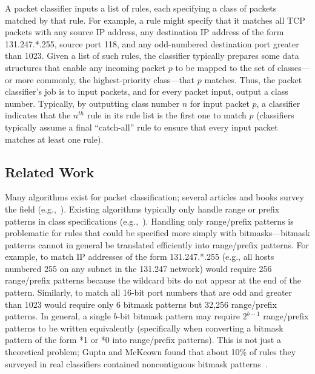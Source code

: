 \documentclass[10pt, conference, compsocconf]{IEEEtran}
\begin{document}
A packet classifier inputs a list of rules, each specifying a class of packets
matched by that rule.  For example, a rule might specify that it matches all TCP
packets with any source IP address, any destination IP address of the form
131.247.*.255, source port 118, and any odd-numbered destination port greater
than 1023.  Given a list of such rules, the classifier typically prepares some
data structures that enable any incoming packet $p$ to be mapped to the set of
classes---or more commonly, the highest-priority class---that $p$ matches.
Thus, the packet classifier's job is to input packets, and for every packet
input, output a class number.  Typically, by outputting class number $n$ for
input packet $p$, a classifier indicates that the $n^{th}$ rule in its rule list
is the first one to match $p$ (classifiers typically assume a final
``catch-all'' rule to ensure that every input packet matches at least one rule).

\subsection{Related Work}
Many algorithms exist for packet classification; several articles and books
survey the field (e.g.,~\cite{taylor:survey,ch48,ch49,medhi+:book}).  Existing
algorithms typically only handle range or prefix patterns in class
specifications (e.g.,~\cite{trie1,speed,geometric,bob,tss,babo-journal}).
Handling only range/prefix patterns is problematic for rules that could be
specified more simply with bitmasks---bitmask patterns cannot in general be
translated efficiently into range/prefix patterns.  For example, to match IP
addresses of the form 131.247.*.255 (e.g., all hosts numbered 255 on any subnet
in the 131.247 network) would require 256 range/prefix patterns because the
wildcard bits do not appear at the end of the pattern.  Similarly, to match all
16-bit port numbers that are odd and greater than 1023 would require only 6
bitmask patterns but 32,256 range/prefix patterns.  In general, a single $b$-bit
bitmask pattern may require $2^{b{-}1}$ range/prefix patterns to be written
equivalently (specifically when converting a bitmask pattern of the form *1 or
*0 into range/prefix patterns).  This is not just a theoretical problem; Gupta
and McKeown found that about 10\% of rules they surveyed in real classifiers
contained noncontiguous bitmask patterns~\cite{pankaj+}.
\end{document}
